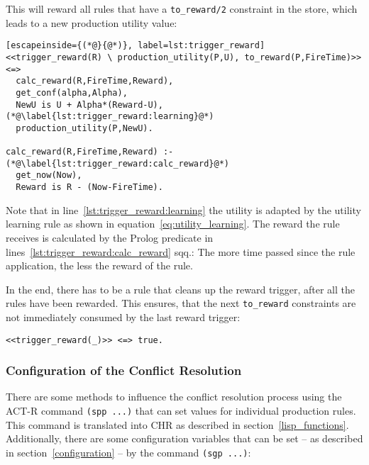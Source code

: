 This will reward all rules that have a \lstinline|to_reward/2| constraint in the store, which leads to a new production utility value:

\begin{lstlisting}[escapeinside={(*@}{@*)}, label=lst:trigger_reward]
<<trigger_reward(R) \ production_utility(P,U), to_reward(P,FireTime)>> <=>
  calc_reward(R,FireTime,Reward),
  get_conf(alpha,Alpha),
  NewU is U + Alpha*(Reward-U), (*@\label{lst:trigger_reward:learning}@*)
  production_utility(P,NewU).
  
calc_reward(R,FireTime,Reward) :- (*@\label{lst:trigger_reward:calc_reward}@*)
  get_now(Now),
  Reward is R - (Now-FireTime).
\end{lstlisting}

Note that in line~\ref{lst:trigger_reward:learning} the utility is adapted by the utility learning rule as shown in equation~\eqref{eq:utility_learning}. The reward the rule receives is calculated by the Prolog predicate in lines~\ref{lst:trigger_reward:calc_reward} sqq.: The more time passed since the rule application, the less the reward of the rule.

In the end, there has to be a rule that cleans up the reward trigger, after all the rules have been rewarded. This ensures, that the next \lstinline|to_reward| constraints are not immediately consumed by the last reward trigger:

\begin{lstlisting}
<<trigger_reward(_)>> <=> true.
\end{lstlisting}

\subsubsection{Configuration of the Conflict Resolution}

There are some methods to influence the conflict resolution process using the ACT-R command \lstinline|(spp ...)| that can set values for individual production rules. This command is translated into CHR as described in section~\ref{lisp_functions}. Additionally, there are some configuration variables that can be set -- as described in section~\ref{configuration} -- by the command \lstinline|(sgp ...)|:

